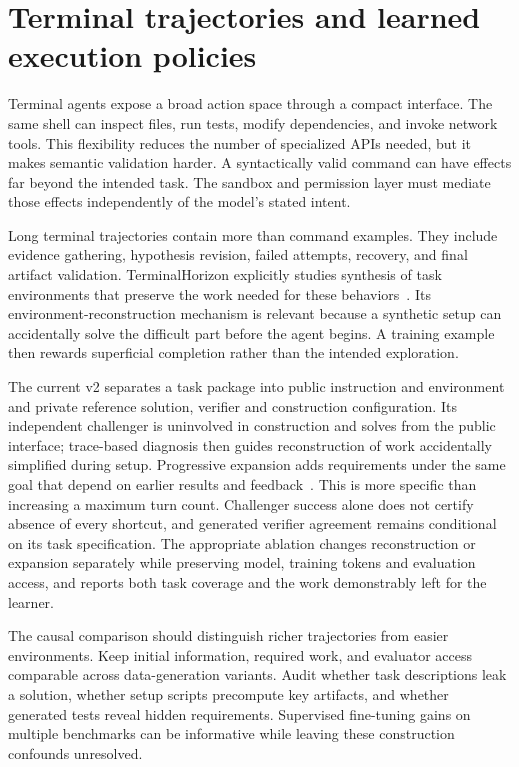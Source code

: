 \section{Terminal trajectories and learned execution policies}\label{sec:C23:terminal}
Terminal agents expose a broad action space through a compact interface. The same shell can inspect files, run tests, modify dependencies, and invoke network tools. This flexibility reduces the number of specialized APIs needed, but it makes semantic validation harder. A syntactically valid command can have effects far beyond the intended task. The sandbox and permission layer must mediate those effects independently of the model's stated intent.

Long terminal trajectories contain more than command examples. They include evidence gathering, hypothesis revision, failed attempts, recovery, and final artifact validation. TerminalHorizon explicitly studies synthesis of task environments that preserve the work needed for these behaviors~\cite{corpus261013166}. Its environment-reconstruction mechanism is relevant because a synthetic setup can accidentally solve the difficult part before the agent begins. A training example then rewards superficial completion rather than the intended exploration.

The current v2 separates a task package into public instruction and environment and private reference solution, verifier and construction configuration. Its independent challenger is uninvolved in construction and solves from the public interface; trace-based diagnosis then guides reconstruction of work accidentally simplified during setup. Progressive expansion adds requirements under the same goal that depend on earlier results and feedback~\cite{corpus261013166}. This is more specific than increasing a maximum turn count. Challenger success alone does not certify absence of every shortcut, and generated verifier agreement remains conditional on its task specification. The appropriate ablation changes reconstruction or expansion separately while preserving model, training tokens and evaluation access, and reports both task coverage and the work demonstrably left for the learner.

The causal comparison should distinguish richer trajectories from easier environments. Keep initial information, required work, and evaluator access comparable across data-generation variants. Audit whether task descriptions leak a solution, whether setup scripts precompute key artifacts, and whether generated tests reveal hidden requirements. Supervised fine-tuning gains on multiple benchmarks can be informative while leaving these construction confounds unresolved.

